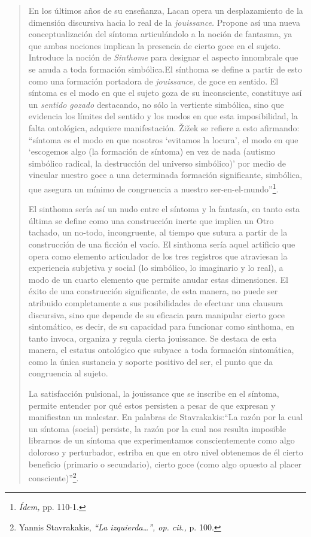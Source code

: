 \begin{quote}
En los últimos años de su enseñanza, Lacan opera un desplazamiento de la dimensión discursiva hacia lo real de la \emph{jouissance.} Propone así una nueva conceptualización del síntoma articulándolo a la noción de fantasma, ya que ambas nociones implican la presencia de cierto goce en el sujeto. Introduce la noción de \emph{Sinthome} para designar el aspecto innombrale que se anuda a toda formación simbólica.El sínthoma se define a partir de esto como una formación portadora de \emph{jouissance,} de goce en sentido. El síntoma es el modo en que el sujeto goza de su inconsciente, constituye así un \emph{sentido gozado} destacando, no sólo la vertiente simbólica, sino que evidencia los límites del sentido y los modos en que esta imposibilidad, la falta ontológica, adquiere manifestación. Žižek se refiere a esto afirmando: \enquote{síntoma es el modo en que nosotros \enquote{evitamos la locura}, el modo en que \enquote{escogemos algo (la formación de síntoma) en vez de nada (autismo simbólico radical, la destrucción del universo simbólico)} por medio de vincular nuestro goce a una determinada formación significante, simbólica, que asegura un mínimo de congruencia a nuestro ser-en-el-mundo}\footnote{\emph{Ídem,} pp. 110-1.}.

El sinthoma sería así un nudo entre el síntoma y la fantasía, en tanto esta última se define como una construcción inerte que implica un Otro tachado, un no-todo, incongruente, al tiempo que sutura a partir de la construcción de una ficción el vacío. El sinthoma sería aquel artificio que opera como elemento articulador de los tres registros que atraviesan la experiencia subjetiva y social (lo simbólico, lo imaginario y lo real), a modo de un cuarto elemento que permite anudar estas dimensiones. El éxito de una construcción significante, de esta manera, no puede ser atribuido completamente a sus posibilidades de efectuar una clausura discursiva, sino que depende de su eficacia para manipular cierto goce sintomático, es decir, de su capacidad para funcionar como sinthoma, en tanto invoca, organiza y regula cierta jouissance. Se destaca de esta manera, el estatus ontológico que subyace a toda formación sintomática, como la única sustancia y soporte positivo del ser, el punto que da congruencia al sujeto.

La satisfacción pulsional, la jouissance que se inscribe en el síntoma, permite entender por qué estos persisten a pesar de que expresan y manifiestan un malestar. En palabras de Stavrakakis:\enquote{La razón por la cual un síntoma (social) persiste, la razón por la cual nos resulta imposible librarnos de un síntoma que experimentamos conscientemente como algo doloroso y perturbador, estriba en que en otro nivel obtenemos de él cierto beneficio (primario o secundario), cierto goce (como algo opuesto al placer consciente)}\footnote{Yannis Stavrakakis, \emph{\enquote{La izquierda\ldots}, op. cit.,} p. 100.}.


\end{quote}
